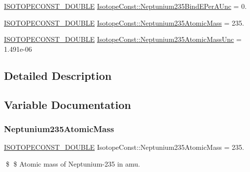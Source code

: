 \begin{DoxyCompactItemize}
\mbox{\hyperlink{group___isotope_const-_macros_ga8f45a7272ce02c0b4c65c44636ed719a}{I\+S\+O\+T\+O\+P\+E\+C\+O\+N\+S\+T\+\_\+\+D\+O\+U\+B\+LE}} \mbox{\hyperlink{group___isotope_const-_neptunium-_np235_ga99366d4392124a00dd9903b3ba34a8b6}{Isotope\+Const\+::\+Neptunium235\+Bind\+E\+Per\+A\+Unc}} = 0.
\item 
\mbox{\hyperlink{group___isotope_const-_macros_ga8f45a7272ce02c0b4c65c44636ed719a}{I\+S\+O\+T\+O\+P\+E\+C\+O\+N\+S\+T\+\_\+\+D\+O\+U\+B\+LE}} \mbox{\hyperlink{group___isotope_const-_neptunium-_np235_ga885c6b571e18ba6c7714161d810abc10}{Isotope\+Const\+::\+Neptunium235\+Atomic\+Mass}} = 235.
\item 
\mbox{\hyperlink{group___isotope_const-_macros_ga8f45a7272ce02c0b4c65c44636ed719a}{I\+S\+O\+T\+O\+P\+E\+C\+O\+N\+S\+T\+\_\+\+D\+O\+U\+B\+LE}} \mbox{\hyperlink{group___isotope_const-_neptunium-_np235_ga2bbad3a2658db6a84a21b01fdaa79753}{Isotope\+Const\+::\+Neptunium235\+Atomic\+Mass\+Unc}} = 1.\+491e-\/06
\end{DoxyCompactItemize}


\subsection{Detailed Description}


\subsection{Variable Documentation}
\mbox{\label{group___isotope_const-_neptunium-_np235_ga885c6b571e18ba6c7714161d810abc10}} 
\subsubsection{\texorpdfstring{Neptunium235\+Atomic\+Mass}{Neptunium235AtomicMass}}
{\footnotesize\ttfamily \mbox{\hyperlink{group___isotope_const-_macros_ga8f45a7272ce02c0b4c65c44636ed719a}{I\+S\+O\+T\+O\+P\+E\+C\+O\+N\+S\+T\+\_\+\+D\+O\+U\+B\+LE}} Isotope\+Const\+::\+Neptunium235\+Atomic\+Mass = 235.}

\$ \$ Atomic mass of Neptunium-\/235 in amu. \mbox{\label{group___isotope_const-_neptunium-_np235_ga2bbad3a2658db6a84a21b01fdaa79753}} 
